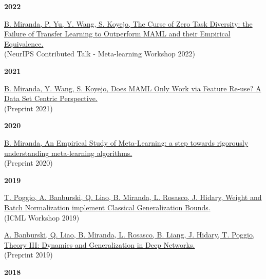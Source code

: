 \documentclass{article}
\newenvironment{changemargin}[2]{%
  \begin{list}{}{%
    \setlength{\topsep}{0pt}%
    \setlength{\leftmargin}{#1}%
    \setlength{\rightmargin}{#2}%
    \setlength{\listparindent}{\parindent}%
    \setlength{\itemindent}{\parindent}%
    \setlength{\parsep}{\parskip}%
  }%
  \item[]}{\end{list}
}
\newenvironment{body} {
	\vspace*{-16pt}
	\begin{changemargin}{-0.25in}{-0.5in}
  }	
	{\end{changemargin}
}
\begin{document}
\begin{body}
    \vspace{12pt}
    \textbf{\large 2022}
    \vspace{4pt}

    \vspace{10pt}
    \href{https://arxiv.org/abs/2208.01545}
    {B. Miranda, P. Yu, Y. Wang, S. Koyejo,
    The Curse of Zero Task Diversity: the Failure of Transfer Learning to Outperform MAML and their Empirical Equivalence.}
    \\
    (NeurIPS Contributed Talk - Meta-learning Workshop 2022)

    \vspace{12pt}
    \textbf{\large 2021}
    \vspace{4pt}

    \vspace{10pt}
    \href{https://arxiv.org/abs/2112.13137}
    {B. Miranda, Y. Wang, S. Koyejo,
    Does MAML Only Work via Feature Re-use? A Data Set Centric Perspective.}
    \\
    (Preprint 2021)

    \vspace{12pt}
    \textbf{\large 2020}
    \vspace{4pt}

    \vspace{10pt}
    \href{https://www.ideals.illinois.edu/handle/2142/109139}
    {B. Miranda,
    An Empirical Study of Meta-Learning: a step towards rigorously understanding meta-learning algorithms.}
    \\
    (Preprint 2020)

    \vspace{12pt}
    \textbf{\large 2019}
    \vspace{4pt}

    \vspace{10pt}
    \href{https://drive.google.com/file/d/1G2IVmbENphwB3lxROEpCHQjsClKqRtKP/view}
    {T. Poggio, A. Banburski, Q. Liao, B. Miranda, L. Rosasco, J. Hidary,
    Weight and Batch Normalization implement Classical Generalization Bounds.}
    \\
    (ICML Workshop 2019)

    \vspace{10pt}
    \href{https://arxiv.org/abs/1903.04991}
    {A. Banburski, Q. Liao, B. Miranda, L. Rosasco, B. Liang, J. Hidary, T. Poggio,
    Theory III: Dynamics and Generalization in Deep Networks.}
    \\
    (Preprint 2019)

    \vspace{12pt}
    \textbf{\large 2018}
    \vspace{4pt}


\end{body}
\end{document}

